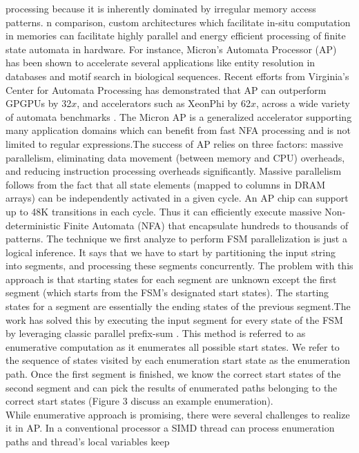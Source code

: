 processing because it is inherently dominated by irregular memory
access patterns. 
n comparison, custom architectures which facilitate in-situ computation in memories can facilitate highly parallel and energy efficient processing of finite state automata in hardware. For instance,
Micron’s Automata Processor (AP) \cite{11} has been shown to accelerate several applications like entity resolution in databases and motif search in biological sequences.
Recent efforts from Virginia’s Center for Automata Processing has
demonstrated that AP can outperform GPGPUs by 32$x$, and accelerators such as XeonPhi by 62$x$, across a wide variety of automata
benchmarks .
The Micron AP is a generalized accelerator supporting many application domains which can benefit from fast NFA processing and is
not limited to regular expressions.The success of AP relies on three
factors: massive parallelism, eliminating data movement (between
memory and CPU) overheads, and reducing instruction processing
overheads significantly. Massive parallelism follows from the fact that all state elements (mapped to columns in DRAM arrays) can be
independently activated in a given cycle. An AP chip can support
up to 48K transitions in each cycle. Thus it can efficiently execute
massive Non-deterministic Finite Automata (NFA) that encapsulate
hundreds to thousands of patterns.
The technique we first analyze to perform FSM parallelization is just a logical inference. It says that we have to start by partitioning the input string into segments, and processing these segments concurrently. The problem with this approach is that starting states for each segment are unknown except the first segment (which starts from the FSM’s designated start states). The starting states for a segment are essentially the ending states of the previous segment.The work \cite{2} has solved this by executing the input segment for every
state of the FSM by leveraging classic parallel prefix-sum . This
method is referred to as enumerative computation as it enumerates
all possible start states. We refer to the sequence of states visited by
each enumeration start state as the enumeration path. Once the first
segment is finished, we know the correct start states of the second
segment and can pick the results of enumerated paths belonging to
the correct start states (Figure 3 discuss an example
enumeration).\\
While enumerative approach is promising, there were several challenges to realize it in AP. In a conventional processor a SIMD thread
can process enumeration paths and thread’s local variables keep
